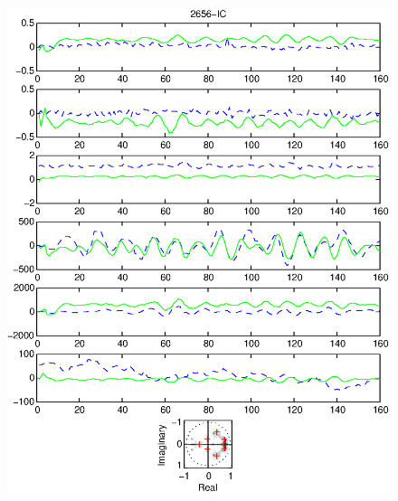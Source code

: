 \documentclass{article}
\begin{document}
\begin{figure}[htb!]\centering
\includegraphics{2656_ic.eps}
\end{figure}\clearpage
\end{document}
